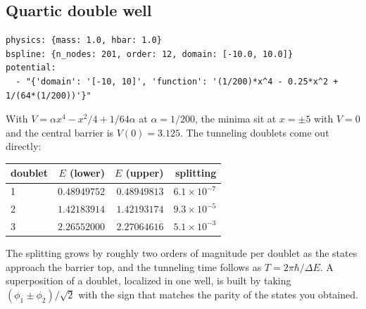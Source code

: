 \documentclass[11pt]{article}
\begin{document}
\subsection*{Quartic double well}
\begin{lstlisting}[style=yaml]
physics: {mass: 1.0, hbar: 1.0}
bspline: {n_nodes: 201, order: 12, domain: [-10.0, 10.0]}
potential:
  - "{'domain': '[-10, 10]', 'function': '(1/200)*x^4 - 0.25*x^2 + 1/(64*(1/200))'}"
\end{lstlisting}
With $V = \alpha x^{4} - x^{2}/4 + 1/64\alpha$ at $\alpha = 1/200$, the minima
sit at $x = \pm5$ with $V=0$ and the central barrier is $V(0) = 3.125$. The
tunneling doublets come out directly:
\begin{center}
\begin{tabular}{@{}lrrr@{}}
\toprule
doublet & $E$ (lower) & $E$ (upper) & splitting \\
\midrule
1 & $0.48949752$ & $0.48949813$ & $6.1\times10^{-7}$ \\
2 & $1.42183914$ & $1.42193174$ & $9.3\times10^{-5}$ \\
3 & $2.26552000$ & $2.27064616$ & $5.1\times10^{-3}$ \\
\bottomrule
\end{tabular}
\end{center}
The splitting grows by roughly two orders of magnitude per doublet as the
states approach the barrier top, and the tunneling time follows as
$T = 2\pi\hbar/\Delta E$. A superposition of a doublet, localized in one well,
is built by taking $(\phi_1 \pm \phi_2)/\sqrt{2}$ with the sign that matches
the parity of the states you obtained.
\end{document}
